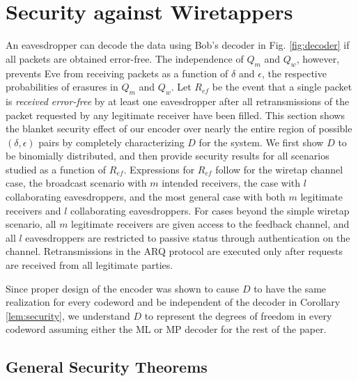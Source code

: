 \documentclass[10pt,twocolumn,twoside]{IEEEtran} \newlength{\pic}
\theoremstyle{definition}
\theoremstyle{remark}
\theoremstyle{plain}
\begin{document}
\section{Security against Wiretappers}\label{sec:analysis}

An eavesdropper can decode the data using Bob's decoder in Fig. \ref{fig:decoder} if all packets are obtained error-free. The independence of $Q_m$ and $Q_w$, however, prevents Eve from receiving packets as a function of $\delta$ and $\epsilon$, the respective probabilities of erasures in $Q_m$ and $Q_w$. Let $R_{ef}$ be the event that a single packet is \emph{received error-free} by at least one eavesdropper after all retransmissions of the packet requested by any legitimate receiver have been filled. This section shows the blanket security effect of our encoder over nearly the entire region of possible $(\delta,\epsilon)$ pairs by completely characterizing $D$ for the system. We first show $D$ to be binomially distributed, and then provide security results for all scenarios studied as a function of $R_{ef}$. Expressions for $R_{ef}$ follow for the wiretap channel case, the broadcast scenario with $m$ intended receivers, the case with $l$ collaborating eavesdroppers, and the most general case with both $m$ legitimate receivers and $l$ collaborating eavesdroppers. For cases beyond the simple wiretap scenario, all $m$ legitimate receivers are given access to the feedback channel, and all $l$ eavesdroppers are restricted to passive status through authentication on the channel. Retransmissions in the ARQ protocol are executed only after requests are received from all legitimate parties.

Since proper design of the encoder was shown to cause $D$ to have the same realization for every codeword and be independent of the decoder in Corollary \ref{lem:security}, we understand $D$ to represent the degrees of freedom in every codeword assuming either the ML or MP decoder for the rest of the paper.

\subsection{General Security Theorems}
\end{document}
